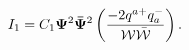 \begin{equation}\label{i1}
I_{1}=C_{1}{\bf \Psi}^{2}{\bf \bar\Psi}^{2}\left({-2q^{a
+}q^{-}_{a}\over {\cal W}\bar{\cal W}}\right).
\end{equation}

